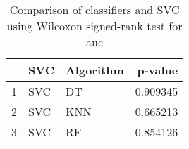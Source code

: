 \begin{table}
\footnotesize
\caption{Comparison of classifiers and SVC using Wilcoxon signed-rank test for auc}
\label{tab:SVC wilcoxon AUC comparison}
\begin{tabular}{lllr}
\hline
 & SVC & Algorithm & p-value \\
\hline
1 & SVC & DT & 0.909345 \\
2 & SVC & KNN & 0.665213 \\
3 & SVC & RF & 0.854126 \\
\hline
\end{tabular}
\end{table}

